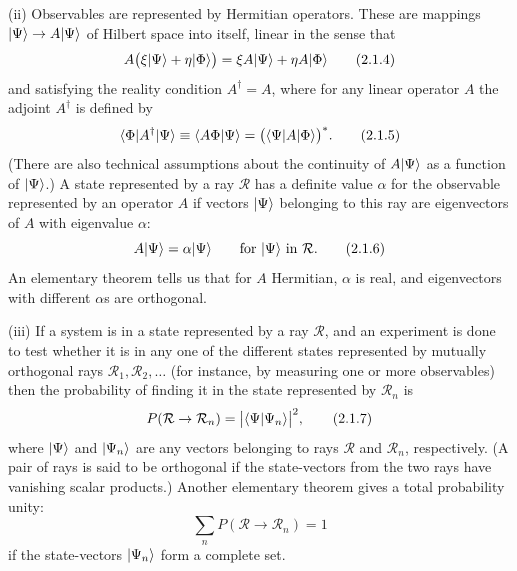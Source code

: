 \medskip
\noindent
(ii) Observables are represented by Hermitian operators. These are
mappings $\lvert \Psi\rangle\to A\lvert \Psi\rangle$ of Hilbert space into itself,
linear in the sense that
\begin{equation}
  A\bigl(\xi\lvert \Psi\rangle+\eta\lvert \Phi\rangle\bigr)
    =\xi A\lvert \Psi\rangle+\eta A\lvert \Phi\rangle
  \tag{2.1.4}\label{eq:2.1.4}
\end{equation}
and satisfying the reality condition $A^{\dagger}=A$, where for any
linear operator $A$ the adjoint $A^{\dagger}$ is defined by
\begin{equation}
  \langle \Phi\rvert A^{\dagger}\lvert \Psi\rangle
    \equiv \langle A\Phi | \Psi\rangle
    =\bigl(\langle \Psi\rvert A\lvert \Phi\rangle\bigr)^{*}.
  \tag{2.1.5}\label{eq:2.1.5}
\end{equation}
(There are also technical assumptions about the continuity of
$A\lvert \Psi\rangle$ as a function of $\lvert \Psi\rangle$.) A state represented by a ray
$\mathcal{R}$ has a definite value $\alpha$ for the observable represented
by an operator $A$ if vectors $\lvert \Psi\rangle$ belonging to this ray are
eigenvectors of $A$ with eigenvalue $\alpha$:
\begin{equation}
  A\lvert \Psi\rangle=\alpha\lvert \Psi\rangle
  \qquad\text{for $\lvert \Psi\rangle$ in $\mathcal{R}$.}
  \tag{2.1.6}\label{eq:2.1.6}
\end{equation}
An elementary theorem tells us that for $A$ Hermitian, $\alpha$ is real,
and eigenvectors with different $\alpha$s are orthogonal.

\medskip
\noindent
(iii) If a system is in a state represented by a ray $\mathcal{R}$, and an
experiment is done to test whether it is in any one of the different states
represented by mutually orthogonal rays $\mathcal{R}_1,\mathcal{R}_2,\ldots$
(for instance, by measuring one or more observables) then the probability
of finding it in the state represented by $\mathcal{R}_n$ is
\begin{equation}
  P(\mathcal{R}\to\mathcal{R}_n)
    =\bigl|\langle \Psi | \Psi_n\rangle\bigr|^2,
  \tag{2.1.7}\label{eq:2.1.7}
\end{equation}
where $\lvert \Psi\rangle$ and $\lvert \Psi_n\rangle$ are any vectors belonging to rays
$\mathcal{R}$ and $\mathcal{R}_n$, respectively. (A pair of rays is said
to be orthogonal if the state-vectors from the two rays have vanishing
scalar products.) Another elementary theorem gives a total probability
unity:
\begin{equation}
  \sum_n P(\mathcal{R}\to\mathcal{R}_n)=1
  \tag{2.1.8}\label{eq:2.1.8}
\end{equation}
if the state-vectors $\lvert \Psi_n\rangle$ form a complete set.

